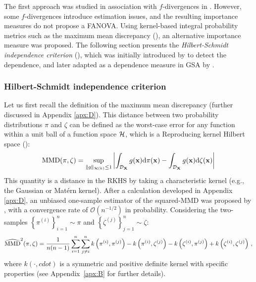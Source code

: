 The first approach was studied in association with $f$-divergences in \citet{daveiga_2015,rahman_2016}. 
However, some $f$-divergences introduce estimation issues, and the resulting importance measures do not propose a FANOVA.  
Using kernel-based integral probability metrics such as the maximum mean discrepancy (), an alternative importance measure was proposed.  
The following section presents the \textit{Hilbert-Schmidt independence criterion} (), which was initially introduced by \citet{gretton_2006} to detect the dependence, and later adapted as a dependence measure in GSA by \citet{daveiga_2015}. 


\subsubsection{Hilbert-Schmidt independence criterion}

Let us first recall the definition of the maximum mean discrepancy (further discussed in Appendix \ref{apx:D}). 
This distance between two probability distributions $\pi$ and $\zeta$ can be defined as the worst-case error for any function within a unit ball of a function space $\mathcal{H}$, which is a Reproducing kernel Hilbert space ():
\begin{equation}
    \mathrm{MMD}(\pi, \zeta) = \sup_{\lVert g \lVert_{\mathcal{H}(k)} \leq 1} \left | \int_{\mathcal{D}_{{\bf X}}} g({\bf x}) \mathrm{d} \pi({\bf x}) - \int_{\mathcal{D}_{{\bf X}}} g({\bf x}) \mathrm{d} \zeta({\bf x}) \right | 
    \label{eq:mmd_chapter1}  
\end{equation}
This quantity is a distance in the RKHS by taking a characteristic kernel (e.g., the Gaussian or Mat\'{e}rn kernel). 
After a calculation developed in Appendix \ref{apx:D}, an unbiased one-sample estimator of the squared-MMD was proposed by \citet{gretton_2006}, 
with a convergence rate of $\mathcal{O}(n^{-1/2})$ in probability. 
Considering the two-samples $\left\{\pi^{(i)}\right\}_{i=1}^n \sim \pi$ and $\left\{\zeta^{(j)}\right\}_{j=1}^n \sim \zeta$: 
\begin{equation}
    \widehat{\mathrm{MMD}}^2(\pi, \zeta) = \frac{1}{n (n-1)} \sum_{i=1}^{n} \sum_{j \neq i}^{n} 
                                k\left(\pi^{(i)}, \pi^{(j)}\right) - k\left(\pi^{(i)}, \zeta^{(j)}\right) - k\left(\zeta^{(i)}, \pi^{(j)}\right) + k\left(\zeta^{(i)}, \zeta^{(j)}\right) \, , 
\label{eq:mmd_ustat}
\end{equation}
where $k(\cdot, cdot)$ is a symmetric and positive definite kernel with specific properties (see Appendix~\ref{apx:B} for further details).

